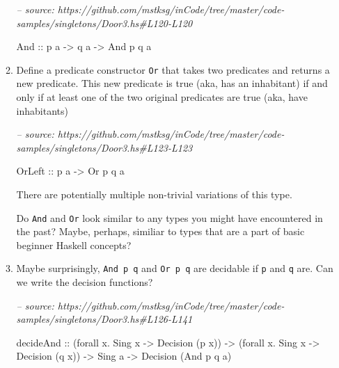 \documentclass[]{article}
\newenvironment{Shaded}{}{}
\newcommand{\CommentTok}[1]{\textcolor[rgb]{0.38,0.63,0.69}{\textit{#1}}}
\newcommand{\DataTypeTok}[1]{\textcolor[rgb]{0.56,0.13,0.00}{#1}}
\newcommand{\FunctionTok}[1]{\textcolor[rgb]{0.02,0.16,0.49}{#1}}
\newcommand{\NormalTok}[1]{#1}
\newcommand{\OtherTok}[1]{\textcolor[rgb]{0.00,0.44,0.13}{#1}}
\begin{document}
\begin{enumerate}
\begin{enumerate}
\begin{Shaded}
\begin{Highlighting}[]
\CommentTok{-- source: https://github.com/mstksg/inCode/tree/master/code-samples/singletons/Door3.hs#L120-L120}

    \DataTypeTok{And}\OtherTok{ ::}\NormalTok{ p a }\OtherTok{->}\NormalTok{ q a }\OtherTok{->} \DataTypeTok{And}\NormalTok{ p q a}
\end{Highlighting}
\end{Shaded}
  \item
    Define a predicate constructor \texttt{Or} that takes two predicates and
    returns a new predicate. This new predicate is true (aka, has an inhabitant)
    if and only if at least one of the two original predicates are true (aka,
    have inhabitants)

\begin{Shaded}
\begin{Highlighting}[]
\CommentTok{-- source: https://github.com/mstksg/inCode/tree/master/code-samples/singletons/Door3.hs#L123-L123}

    \DataTypeTok{OrLeft}\OtherTok{  ::}\NormalTok{ p a }\OtherTok{->} \DataTypeTok{Or}\NormalTok{ p q a}
\end{Highlighting}
\end{Shaded}

    There are potentially multiple non-trivial variations of this type.

    Do \texttt{And} and \texttt{Or} look similar to any types you might have
    encountered in the past? Maybe, perhaps, similiar to types that are a part
    of basic beginner Haskell concepts?
  \item
    Maybe surprisingly, \texttt{And\ p\ q} and \texttt{Or\ p\ q} are decidable
    if \texttt{p} and \texttt{q} are. Can we write the decision functions?

\begin{Shaded}
\begin{Highlighting}[]
\CommentTok{-- source: https://github.com/mstksg/inCode/tree/master/code-samples/singletons/Door3.hs#L126-L141}

\NormalTok{decideAnd}
\OtherTok{    ::}\NormalTok{ (forall x}\FunctionTok{.} \DataTypeTok{Sing}\NormalTok{ x }\OtherTok{->} \DataTypeTok{Decision}\NormalTok{ (p x))}
    \OtherTok{->}\NormalTok{ (forall x}\FunctionTok{.} \DataTypeTok{Sing}\NormalTok{ x }\OtherTok{->} \DataTypeTok{Decision}\NormalTok{ (q x))}
    \OtherTok{->} \DataTypeTok{Sing}\NormalTok{ a}
    \OtherTok{->} \DataTypeTok{Decision}\NormalTok{ (}\DataTypeTok{And}\NormalTok{ p q a)}


\end{Highlighting}
\end{Shaded}
\end{enumerate}
\end{enumerate}
\end{document}
